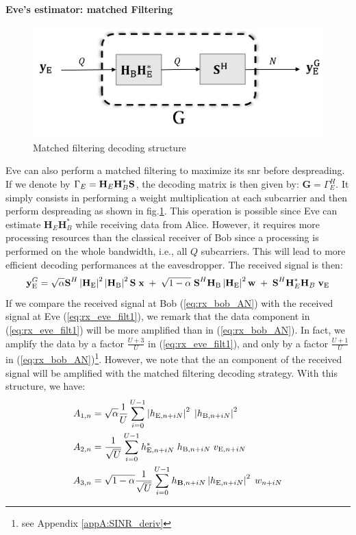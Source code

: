  \paragraph{Eve's estimator: matched Filtering}
\begin{figure}[htb!]
    \centering
    \includegraphics[width=.5\linewidth]{img/matched_filter.png}
    \caption{Matched filtering decoding structure}
    \label{fig:matched_filter}
\end{figure}
Eve can also perform a matched filtering to maximize its \gls{snr} before despreading. If we denote by $\Gamma_E = \textbf{H}_E \textbf{H}_B^* \textbf{S}$, the decoding matrix is then given by: $\textbf{G}=\Gamma_E^H$. It simply consists in performing a weight multiplication at each subcarrier and then perform despreading as shown in fig.\ref{fig:matched_filter}. This operation is possible since Eve can estimate $\textbf{H}_E \textbf{H}_B^*$ while receiving data from Alice. However, it requires more processing resources than the classical receiver of Bob since a processing is performed on the whole bandwidth, i.e., all $Q$ subcarriers. This will lead to more efficient decoding performances at the eavesdropper. The received signal is then:
\begin{equation}
    \textbf{y}_{\text{E}}^G = \sqrt{\alpha} \textbf{S}^H \left|\textbf{H}_{\text{E}}\right|^2 \left|\textbf{H}_{\text{B}}\right|^2 \textbf{S}\; \textbf{x} \; +  \; \sqrt{1-\alpha} \; \textbf{S}^H \textbf{H}_{\text{B}}\left|\textbf{H}_{\text{E}}\right|^2 \textbf{w}  \; +  \; \textbf{S}^H  \textbf{H}^*_E \textbf{H}_B \;\textbf{v}_{\text{E}}
    \label{eq:rx_eve_filt1}
\end{equation}
If we compare the received signal at Bob (\ref{eq:rx_bob_AN}) with the received signal at Eve (\ref{eq:rx_eve_filt1}), we remark that the data component in (\ref{eq:rx_eve_filt1}) will be more amplified than in (\ref{eq:rx_bob_AN}). In fact, we amplify the data by a factor $\frac{U+3}{U}$ in (\ref{eq:rx_eve_filt1}), and only by a factor $\frac{U+1}{U}$ in (\ref{eq:rx_bob_AN})\footnote{see Appendix \ref{appA:SINR_deriv}}. However, we note that the \gls{an} component of the received signal will be amplified with the matched filtering decoding strategy. With this structure, we have:
\begin{equation}
    \begin{split}
        A_{1,n} &= \sqrt{\alpha}\frac{1}{U}\sum_{i=0}^{U-1}  \left|h_{\text{E}, n + iN}\right|^2 \; \left|h_{\text{B}, n + iN}\right|^2 \\
        A_{2,n} &= \frac{1}{\sqrt{U}}\sum_{i=0}^{U-1} h^*_{\text{E}, n + iN} \; h_{\text{B}, n + iN} \; v_{\text{E}, n + iN}\\
        A_{3,n} &= \sqrt{1-\alpha}\frac{1}{\sqrt{U}}\sum_{i=0}^{U-1}    h_{\text{\textbf{B}}, n + iN} \left|h_{\text{E}, n + iN}\right|^2\; w_{n + iN}
    \end{split}
\end{equation}
